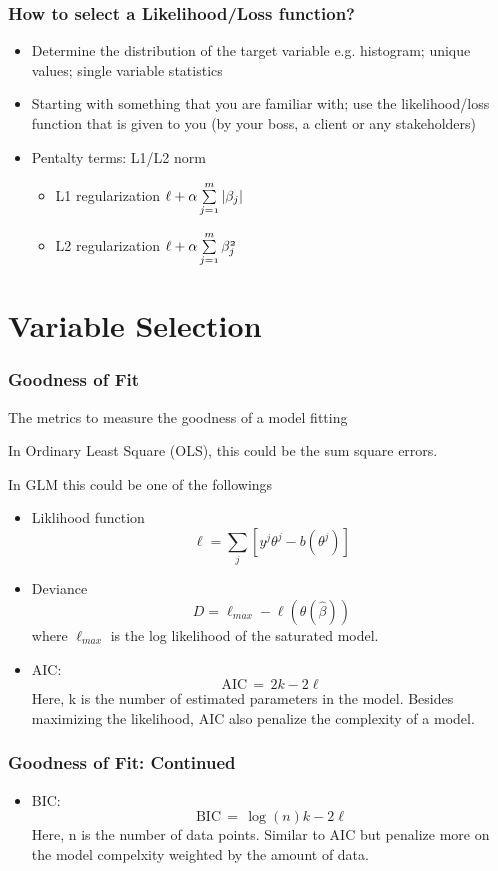 \documentclass[notheorems, aspectratio=54]{beamer}
\begin{document}
\begin{frame}
\frametitle{How to select a Likelihood/Loss function?}
\begin{itemize}
\item Determine the distribution of the target variable e.g. histogram; unique values; single variable statistics
\item Starting with something that you are familiar with; use the likelihood/loss function that is given to you (by your boss, a client or any stakeholders)
\item Pentalty terms: L1/L2 norm 
\begin{itemize}
\item L1 regularization $\mathnormal{\ell+\alpha \sum\limits_{j=1}^m|\beta_j|}$
\item L2 regularization $\mathnormal{\ell+\alpha \sum\limits_{j=1}^m\beta_j^2}$
\end{itemize}


\end{itemize}
\end{frame}

\section{Variable Selection}

\begin{frame}
\frametitle{Goodness of Fit}

The metrics to measure the goodness of a model fitting

In Ordinary Least Square (OLS), this could be the sum square errors.

In GLM this could be one of the followings
\begin{itemize}
\item Liklihood function$$\ell=\sum_{j} \left[y^j\theta^j-b(\theta^j)\right]$$

\item Deviance $$D=\ell_{max}-\ell(\theta (\hat{\beta}))$$ where $\ell_{max}$ is the log likelihood of the saturated model.

\item AIC: $${\displaystyle \mathrm {AIC} \,=\,2k-2\ell}$$
Here, k is the number of estimated parameters in the model. Besides maximizing the likelihood, AIC also penalize the complexity of a model.

\end{itemize}
\end{frame}

\begin{frame}
\frametitle{Goodness of Fit: Continued}
\begin{itemize}
\item BIC: $${\displaystyle \mathrm {BIC} \,=\,\log(n)k-2{\ell}}$$
Here, n is the number of data points. Similar to AIC but penalize more on the model compelxity weighted by the amount of data.
\end{itemize}
\end{frame}
\end{document}
